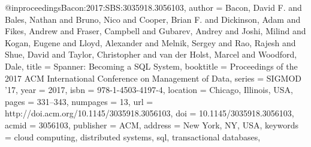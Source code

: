 @inproceedings{Bacon:2017:SBS:3035918.3056103,
  author = {Bacon, David F. and Bales, Nathan and Bruno, Nico and Cooper, Brian F. and Dickinson, Adam and Fikes, Andrew and Fraser, Campbell and Gubarev, Andrey and Joshi, Milind and Kogan, Eugene and Lloyd, Alexander and Melnik, Sergey and Rao, Rajesh and Shue, David and Taylor, Christopher and van der Holst, Marcel and Woodford, Dale},
  title = {Spanner: Becoming a SQL System},
  booktitle = {Proceedings of the 2017 ACM International Conference on Management of Data},
  series = {SIGMOD '17},
  year = {2017},
  isbn = {978-1-4503-4197-4},
  location = {Chicago, Illinois, USA},
  pages = {331--343},
  numpages = {13},
  url = {http://doi.acm.org/10.1145/3035918.3056103},
  doi = {10.1145/3035918.3056103},
  acmid = {3056103},
  publisher = {ACM},
  address = {New York, NY, USA},
  keywords = {cloud computing, distributed systems, sql, transactional databases},
}
